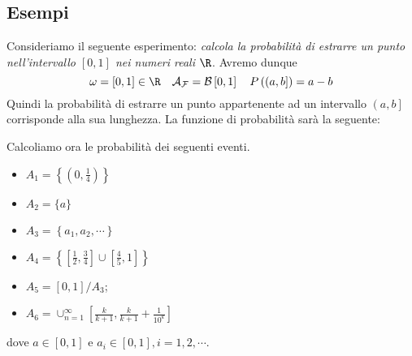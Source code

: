 \subsection{Esempi}
Consideriamo il seguente esperimento: \textit{calcola la probabilità di estrarre un punto nell'intervallo $ \left[0,1\right] $ nei numeri reali $ \R $}. Avremo dunque
\[
	\omega = \left[0,1\right] \in \R \quad \mathcal{A}_{\mathcal{F}} = \mathcal{B}\left[0,1\right] \quad P\left(\left(a,b\right]\right) = a-b
\]
Quindi la probabilità di estrarre un punto appartenente ad un intervallo $ \left(a,b\right] $ corrisponde alla sua lunghezza. La funzione di probabilità sarà la seguente:
	\begin{center}
			Calcoliamo ora le probabilità dei seguenti eventi.
			\begin{itemize}
				\item $A_1=\left\{\left(0, \frac{1}{4}\right)\right\}$
				\item $A_2=\{a\}$
				\item $A_3=\left\{a_1, a_2, \cdots\right\}$
				\item $A_4=\left\{\left[\frac{1}{2}, \frac{3}{4}\right] \cup\left[\frac{4}{5}, 1\right]\right\}$
				\item $A_5=[0,1] / A_3$;
				\item $A_6=\cup_{n=1}^{\infty}\left[\frac{k}{k+1}, \frac{k}{k+1}+\frac{1}{10^k}\right]$
			\end{itemize}
			dove $a \in[0,1]$ e $a_i \in[0,1], i=1,2, \cdots$.


\end{center}
